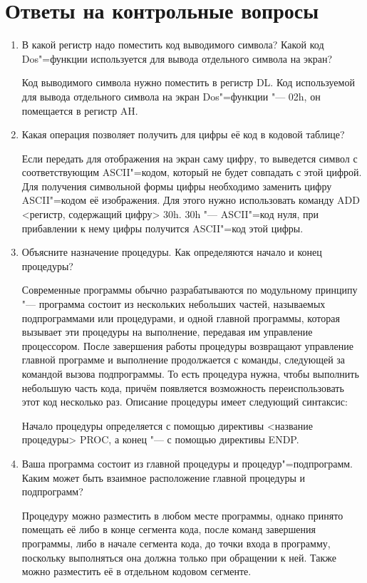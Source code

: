 \documentclass[bachelor, och, otchet]{../SCWorks}
\begin{document}
\section{Ответы на контрольные вопросы}
\begin{enumerate}
\item В какой регистр надо поместить код выводимого символа? Какой код Dos"=функции используется для вывода отдельного символа на экран?

Код выводимого символа нужно поместить в регистр DL. Код используемой для вывода отдельного символа на экран Dos"=функции "--- 02h, он помещается в регистр AH.

\item Какая операция позволяет получить для цифры её код в кодовой таблице?

Если передать для отображения на экран саму цифру, то выведется символ с соответствующим ASCII"=кодом, который не будет совпадать с этой цифрой. Для получения символьной формы цифры необходимо заменить цифру ASCII"=кодом её изображения. Для этого нужно использовать команду ADD <регистр, содержащий цифру> 30h. 30h "--- ASCII"=код нуля, при прибавлении к нему цифры получится ASCII"=код этой цифры.

\item Объясните назначение процедуры. Как определяются начало и конец процедуры?

Современные программы обычно разрабатываются по модульному принципу "--- программа состоит из нескольких небольших частей, называемых подпрограммами или процедурами, и одной главной программы, которая вызывает эти процедуры на выполнение, передавая им управление процессором. После завершения работы процедуры возвращают управление главной программе и выполнение продолжается с команды, следующей за командой вызова подпрограммы. То есть процедура нужна, чтобы выполнить небольшую часть кода, причём появляется возможность переиспользовать этот код несколько раз. Описание процедуры имеет следующий синтаксис:



Начало процедуры определяется с помощью директивы <название процедуры> PROC, а конец "--- с помощью директивы ENDP.

\item Ваша программа состоит из главной процедуры и процедур"=подпрограмм. Каким может быть взаимное расположение главной процедуры и подпрограмм?

Процедуру можно разместить в любом месте программы, однако принято помещать её либо в конце сегмента кода, после команд завершения программы, либо в начале сегмента кода, до точки входа в программу, поскольку выполняться она должна только при обращении к ней. Также можно разместить её в отдельном кодовом сегменте.


\end{enumerate}
\end{document}
